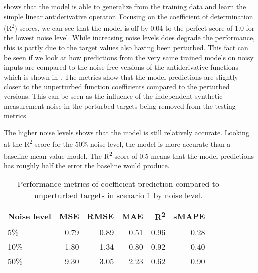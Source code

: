  shows that the model is able to generalize from the training data and learn the simple linear antiderivative operator. Focusing on the coefficient of determination (R\textsuperscript{2}) scores, we can see that the model is off by 0.04 to the perfect score of 1.0 for the lowest noise level.  While increasing noise levels does degrade the performance, this is partly due to the target values also having been perturbed. This fact can be seen if we look at how predictions from the very same trained models on noisy inputs are compared to the noise-free versions of the antiderivative functions which is shown in . The metrics show that the model predictions are slightly closer to the unperturbed function coefficients compared to the perturbed versions. This can be seen as the influence of the independent synthetic measurement noise in the perturbed targets being removed from the testing metrics.

The higher noise levels shows that the model is still relatively accurate. Looking at the R\textsuperscript{2} score for the 50\% noise level, the model is more accurate than a baseline mean value model. The R\textsuperscript{2} score of 0.5 means that the model predictions has roughly half the error the baseline would produce.

\begin{table}[H]
  \caption{Performance metrics of coefficient prediction compared to unperturbed targets in scenario 1 by noise level.}\label{table:scenario_1_clean_spectral_metrics}
  \centering
  \begin{tabular}{lrrrrrrrr}
    \toprule
    Noise level & MSE  & RMSE & MAE  & R\textsuperscript{2}   & sMAPE \\
    \midrule
    5\%         & 0.79 & 0.89 & 0.51 & 0.96 & 0.28  \\
    10\%        & 1.80 & 1.34 & 0.80 & 0.92 & 0.40  \\
    50\%        & 9.30 & 3.05 & 2.23 & 0.62 & 0.90  \\
    \bottomrule
  \end{tabular}
\end{table}

